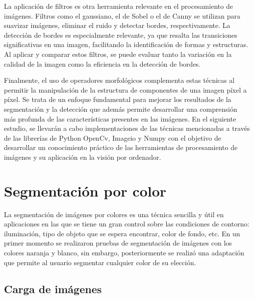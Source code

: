 \documentclass[a4paper,12pt]{article}
\begin{document}
{\vspace{0.5cm}
La aplicación de filtros es otra herramienta relevante en el procesamiento de imágenes. Filtros como el gaussiano, el de
Sobel o el de Canny se utilizan para suavizar imágenes, eliminar el ruido y detectar bordes, respectivamente. La detección de bordes
es especialmente relevante, ya que resalta las transiciones significativas en una imagen, facilitando la identificación de 
 formas y estructuras. Al aplicar y comparar estos filtros, se puede evaluar tanto la variación en la calidad de la imagen como
la eficiencia en la detección de bordes.

\vspace{0.5cm}
Finalmente, el uso de operadores morfológicos complementa estas técnicas al permitir la manipulación de la estructura de componentes
de una imagen píxel a píxel. Se trata de un enfoque fundamental para mejorar los resultados de la segmentación y la 
detección que además permite desarrollar una comprensión más profunda de las características presentes en las imágenes. En el siguiente estudio, 
se llevarán a cabo implementaciones de las técnicas mencionadas a través de las librerías de Python OpenCv, Imageio y Numpy con el objetivo de
desarrollar un conocimiento práctico de las herramientas de procesamiento de imágenes y su aplicación en la visión por ordenador.

\newpage


\section{Segmentación por color}


\vspace{1cm}

La segmentación de imágenes por colores es una técnica sencilla y útil en aplicaciones en las que se tiene un gran control
sobre las condiciones de contorno: iluminación, tipo de objeto que se espera encontrar, color de fondo, etc.
En un primer momento se realizaron pruebas de segmentación de imágenes con los colores naranja y blanco, sin embargo, posteriormente
se realizó una adaptación que permite al usuario segmentar cualquier color de su elección.

\vspace{0.5cm}

\subsection{Carga de imágenes}

}
\end{document}
